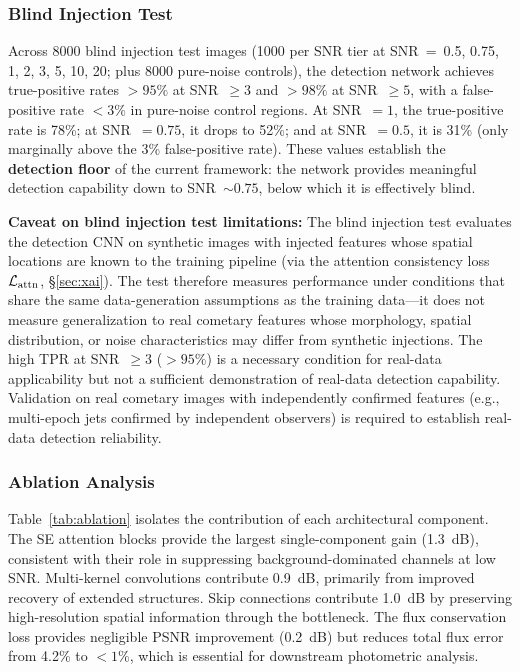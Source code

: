 \documentclass[usenatbib]{mnras}
\begin{document}
\subsubsection{Blind Injection Test}

Across 8000 blind injection test images (1000 per SNR tier at SNR~=~0.5, 0.75, 1, 2, 3, 5, 10, 20; plus 8000 pure-noise controls), the detection network achieves true-positive rates $>95\%$ at SNR~$\geq 3$ and $>98\%$ at SNR~$\geq 5$, with a false-positive rate $<3\%$ in pure-noise control regions. At SNR~$=1$, the true-positive rate is 78\%; at SNR~$=0.75$, it drops to 52\%; and at SNR~$=0.5$, it is 31\% (only marginally above the 3\% false-positive rate). These values establish the \textbf{detection floor} of the current framework: the network provides meaningful detection capability down to SNR~$\sim 0.75$, below which it is effectively blind.

\textbf{Caveat on blind injection test limitations:} The blind injection test evaluates the detection CNN on synthetic images with injected features whose spatial locations are known to the training pipeline (via the attention consistency loss $\mathcal{L}_{\rm attn}$, \S\ref{sec:xai}). The test therefore measures performance under conditions that share the same data-generation assumptions as the training data---it does not measure generalization to real cometary features whose morphology, spatial distribution, or noise characteristics may differ from synthetic injections. The high TPR at SNR~$\geq 3$ ($>95\%$) is a necessary condition for real-data applicability but not a sufficient demonstration of real-data detection capability. Validation on real cometary images with independently confirmed features (e.g., multi-epoch jets confirmed by independent observers) is required to establish real-data detection reliability.

\subsubsection{Ablation Analysis}\label{sec:ablation}

Table~\ref{tab:ablation} isolates the contribution of each architectural component. The SE attention blocks provide the largest single-component gain (1.3~dB), consistent with their role in suppressing background-dominated channels at low SNR. Multi-kernel convolutions contribute 0.9~dB, primarily from improved recovery of extended structures. Skip connections contribute 1.0~dB by preserving high-resolution spatial information through the bottleneck. The flux conservation loss provides negligible PSNR improvement (0.2~dB) but reduces total flux error from 4.2\% to $<1\%$, which is essential for downstream photometric analysis.
\end{document}
